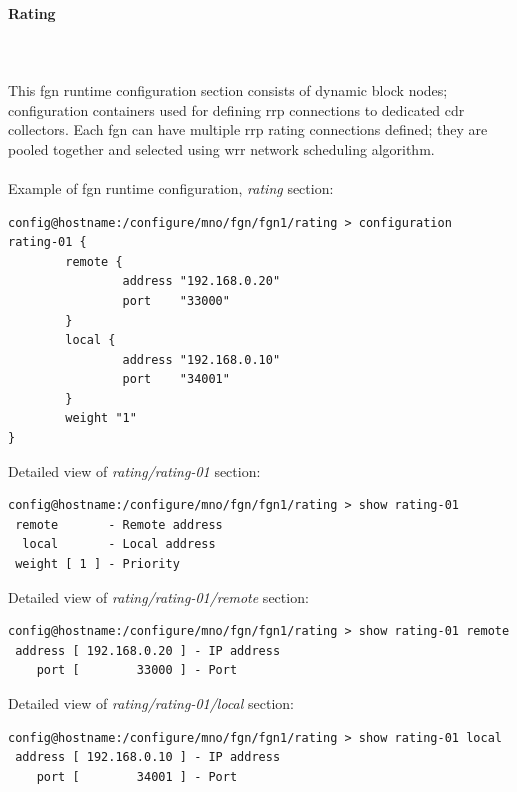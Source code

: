 \documentclass[a4paper,latin]{paper}
\begin{document}
\paragraph{Rating}\mbox{}\\\\
This \acrshort{fgn} runtime configuration section consists of dynamic block \glspl{node}; configuration containers used for 
defining \acrfull{rrp} connections to dedicated \acrfull{cdr} collectors. Each \acrfull{fgn} can have
multiple \acrshort{rrp} rating connections defined; they are pooled together and selected using \acrfull{wrr}
network scheduling algorithm.\\\\
Example of \acrfull{fgn} runtime configuration, \textit{rating} section:
\begin{lstlisting}[style=BashInputStyle, belowskip=\baselineskip]
config@hostname:/configure/mno/fgn/fgn1/rating > configuration 
rating-01 {
        remote {
                address "192.168.0.20"
                port    "33000"
        }                      
        local {
                address "192.168.0.10"
                port    "34001"
        }                      
        weight "1"
}
\end{lstlisting}
Detailed view of \textit{rating/rating-01} section:
\begin{lstlisting}[style=BashInputStyle, belowskip=\baselineskip]
config@hostname:/configure/mno/fgn/fgn1/rating > show rating-01
 remote       - Remote address
  local       - Local address 
 weight [ 1 ] - Priority
\end{lstlisting}
Detailed view of \textit{rating/rating-01/remote} section:
\begin{lstlisting}[style=BashInputStyle, belowskip=\baselineskip]
config@hostname:/configure/mno/fgn/fgn1/rating > show rating-01 remote
 address [ 192.168.0.20 ] - IP address
    port [        33000 ] - Port      
\end{lstlisting}
Detailed view of \textit{rating/rating-01/local} section:
\begin{lstlisting}[style=BashInputStyle, belowskip=\baselineskip]
config@hostname:/configure/mno/fgn/fgn1/rating > show rating-01 local
 address [ 192.168.0.10 ] - IP address
    port [        34001 ] - Port  
\end{lstlisting}
\end{document}
